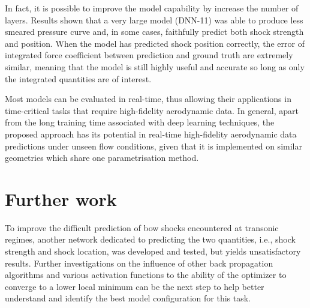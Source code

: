 \documentclass[11pt]{article}
\begin{document}
In fact, it is possible to improve the model capability by increase the number of layers. Results shown that a very large model (DNN-11) was able to produce less smeared pressure curve and, in some cases, faithfully predict both shock strength and position. When the model has predicted shock position correctly, the error of integrated force coefficient between prediction and ground truth are extremely similar, meaning that the model is still highly useful and accurate so long as only the integrated quantities are of interest.

Most models can be evaluated in real-time, thus allowing their applications in time-critical tasks that require high-fidelity aerodynamic data. In general, apart from the long training time associated with deep learning techniques, the proposed approach has its potential in real-time high-fidelity aerodynamic data predictions under unseen flow conditions, given that it is implemented on similar geometries which share one parametrisation method.

\section{Further work}

To improve the difficult prediction of bow shocks encountered at transonic regimes, another network dedicated to predicting the two quantities, i.e., shock strength and shock location, was developed and tested, but yields unsatisfactory results. Further investigations on the influence of other back propagation algorithms and various activation functions to the ability of the optimizer to converge to a lower local minimum can be the next step to help better understand and identify the best model configuration for this task.



\end{document}
